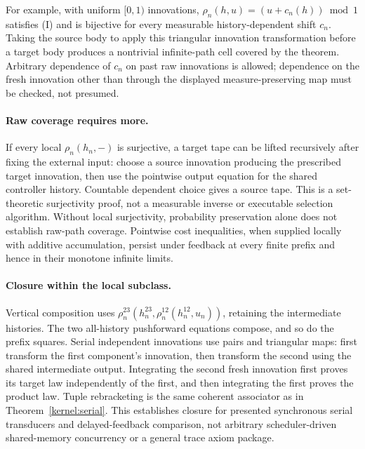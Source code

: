 \documentclass[11pt]{article}
\begin{document}
For example, with uniform $[0,1)$ innovations, $\rho_n(h,u)=(u+c_n(h))\bmod 1$ satisfies (I) and is bijective for every measurable history-dependent shift $c_n$. Taking the source body to apply this triangular innovation transformation before a target body produces a nontrivial infinite-path cell covered by the theorem. Arbitrary dependence of $c_n$ on past raw innovations is allowed; dependence on the fresh innovation other than through the displayed measure-preserving map must be checked, not presumed.

\paragraph{Raw coverage requires more.} If every local $\rho_n(h_n,-)$ is surjective, a target tape can be lifted recursively after fixing the external input: choose a source innovation producing the prescribed target innovation, then use the pointwise output equation for the shared controller history. Countable dependent choice gives a source tape. This is a set-theoretic surjectivity proof, not a measurable inverse or executable selection algorithm. Without local surjectivity, probability preservation alone does not establish raw-path coverage. Pointwise cost inequalities, when supplied locally with additive accumulation, persist under feedback at every finite prefix and hence in their monotone infinite limits.

\paragraph{Closure within the local subclass.} Vertical composition uses $\rho^{23}_n(h^{23}_n,\rho^{12}_n(h^{12}_n,u_n))$, retaining the intermediate histories. The two all-history pushforward equations compose, and so do the prefix squares. Serial independent innovations use pairs and triangular maps: first transform the first component's innovation, then transform the second using the shared intermediate output. Integrating the second fresh innovation first proves its target law independently of the first, and then integrating the first proves the product law. Tuple rebracketing is the same coherent associator as in Theorem~\ref{kernel:serial}. This establishes closure for presented synchronous serial transducers and delayed-feedback comparison, not arbitrary scheduler-driven shared-memory concurrency or a general trace axiom package.
\end{document}
